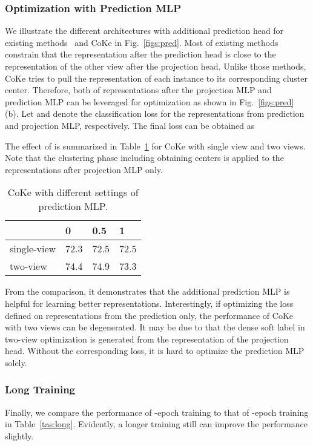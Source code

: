 \documentclass[10pt,twocolumn,letterpaper]{article}
\begin{document}
\subsubsection{Optimization with Prediction MLP}
We illustrate the different architectures with additional prediction head for existing methods~\cite{GrillSATRBDPGAP20, ChenKSNH20} and CoKe in Fig.~\ref{figs:pred}. Most of existing methods constrain that the representation after the prediction head is close to the representation of the other view after the projection head. Unlike those methods, CoKe tries to pull the representation of each instance to its corresponding cluster center. Therefore, both of representations after the projection MLP and prediction MLP can be leveraged for optimization as shown in Fig.~\ref{figs:pred} (b). Let  and  denote the classification loss for the representations from prediction and projection MLP, respectively. The final loss can be obtained as 

The effect of  is summarized in Table~\ref{tas:beta} for CoKe with single view and two views. Note that the clustering phase including obtaining centers is applied to the representations after projection MLP only.

\begin{table}[!ht]
\centering
\begin{tabular}{|l|l|l|l|}\hline
&0&0.5&1\\\hline
single-view &72.3 & 72.5&72.5\\\hline
two-view&74.4&74.9&73.3\\\hline
\end{tabular}
\caption{CoKe with different settings of prediction MLP.}\label{tas:beta}
\end{table}

From the comparison, it demonstrates that the additional prediction MLP is helpful for learning better representations. Interestingly, if optimizing the loss defined on representations from the prediction only, the performance of CoKe with two views can be degenerated. It may be due to that the dense soft label in two-view optimization is generated from the representation of the projection head. Without the corresponding loss, it is hard to optimize the prediction MLP solely.

\subsubsection{Long Training}
Finally, we compare the performance of -epoch training to that of -epoch training in Table~\ref{tas:long}. Evidently, a longer training still can improve the performance slightly.
\end{document}
